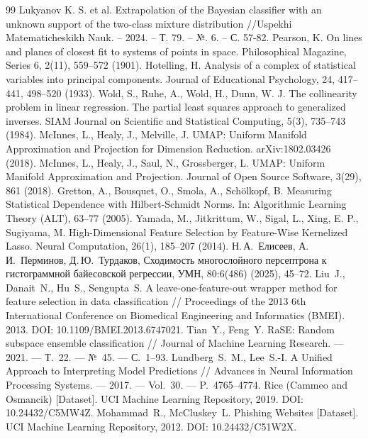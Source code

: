 \documentclass[12pt,a4paper]{article}
\begin{document}
\begin{thebibliography}{99}
     Lukyanov K. S. et al. Extrapolation of the Bayesian classifier with an unknown support of the two-class mixture distribution //Uspekhi Matematicheskikh Nauk. – 2024. – Т. 79. – №. 6. – С. 57-82.
     Pearson, K. On lines and planes of closest fit to systems of points in space. Philosophical Magazine, Series 6, 2(11), 559--572 (1901).
     Hotelling, H. Analysis of a complex of statistical variables into principal components. Journal of Educational Psychology, 24, 417--441, 498--520 (1933).
     Wold, S., Ruhe, A., Wold, H., Dunn, W. J. The collinearity problem in linear regression. The partial least squares approach to generalized inverses. SIAM Journal on Scientific and Statistical Computing, 5(3), 735--743 (1984).
     McInnes, L., Healy, J., Melville, J. UMAP: Uniform Manifold Approximation and Projection for Dimension Reduction. arXiv:1802.03426 (2018).
     McInnes, L., Healy, J., Saul, N., Grossberger, L. UMAP: Uniform Manifold Approximation and Projection. Journal of Open Source Software, 3(29), 861 (2018).
     Gretton, A., Bousquet, O., Smola, A., Sch{\"o}lkopf, B. Measuring Statistical Dependence with Hilbert-Schmidt Norms. In: Algorithmic Learning Theory (ALT), 63--77 (2005).
     Yamada, M., Jitkrittum, W., Sigal, L., Xing, E. P., Sugiyama, M. High-Dimensional Feature Selection by Feature-Wise Kernelized Lasso. Neural Computation, 26(1), 185--207 (2014).
     Н.\,А.~Елисеев, А.\,И.~Перминов, Д.\,Ю.~Турдаков, Сходимость многослойного персептрона к гистограммной байесовской регрессии, УМН, 80:6(486) (2025), 45--72.
     Liu~J., Danait~N., Hu~S., Sengupta~S. A leave-one-feature-out wrapper method for feature selection in data classification // Proceedings of the 2013 6th International Conference on Biomedical Engineering and Informatics (BMEI). 2013. DOI: 10.1109/BMEI.2013.6747021.
     Tian~Y., Feng~Y. RaSE: Random subspace ensemble classification // Journal of Machine Learning Research. --- 2021. --- Т.~22. --- №~45. --- С.~1--93.
    Lundberg~S.~M., Lee~S.-I. A Unified Approach to Interpreting Model Predictions // Advances in Neural Information Processing Systems. --- 2017. --- Vol.~30. --- P.~4765--4774.
     Rice (Cammeo and Osmancik) [Dataset]. UCI Machine Learning Repository, 2019. DOI: 10.24432/C5MW4Z.
     Mohammad~R., McCluskey~L. Phishing Websites [Dataset]. UCI Machine Learning Repository, 2012. DOI: 10.24432/C51W2X.
\end{thebibliography}
\end{document}
